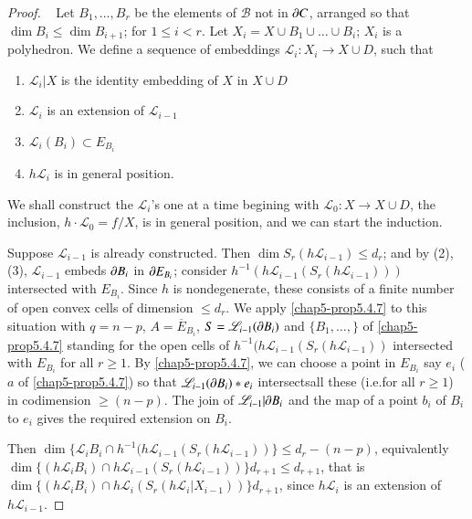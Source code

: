 \begin{proof}
\medskip
{}~ Let $B_{1},\ldots,B_{r}$ be the elements of $\mathscr{B}$ not in $\partial C$, arranged so that $\dim B_{i}\leq \dim B_{i+1}$; for $1\leq i<r$. Let $X_{i}=X\cup B_{1}\cup\ldots\cup B_{i}$; $X_{i}$ is a polyhedron. We define a sequence of embeddings $\mathscr{L}_{i}:X_{i}\to X\cup D$, such that
\begin{enumerate}
\renewcommand{\labelenumi}{(\theenumi)}
\item $\mathscr{L}_{i}|X$ is the identity embedding of $X$ in $X\cup D$

\item $\mathscr{L}_{i}$ is an extension of $\mathscr{L}_{i-1}$

\item $\mathscr{L}_{i}(B_{i})\subset E_{B_{i}}$

\item $h\mathscr{L}_{i}$ is in general position.
\end{enumerate}

We shall construct the $\mathscr{L}_{i}$'s one at a time begining with $\mathscr{L}_{0}:X\to X\cup D$, the inclusion, $h\cdot \mathscr{L}_{0}=f/X$, is in general position, and we can start the induction.

Suppose $\mathscr{L}_{i-1}$ is already constructed. Then $\dim S_{r}(h\mathscr{L}_{i-1})\leq d_{r}$; and by (2), (3), $\mathscr{L}_{i-1}$ embeds $\partial B_{i}$ in $\partial E_{B_{i}}$; consider $h^{-1}(h\mathscr{L}_{i-1}(S_{r}(h\mathscr{L}_{i-1})))$ intersected with $E_{B_{i}}$. Since $h$ is nondegenerate, these consists of a finite number of open convex cells of dimension $\leq d_{r}$. We apply \ref{chap5-prop5.4.7} to this situation with $q=n-p$, $A=\overline{E}_{B_{i}}$, $S=\mathscr{L}_{i-1}(\partial B_{i})$ and $\{B_{1},\ldots,\}$ of \ref{chap5-prop5.4.7} standing for the open cells of $h^{-1}(h\mathscr{L}_{i-1}(S_{r}(h\mathscr{L}_{i-1}))$ intersected with $E_{B_{i}}$ for all $r\geq 1$. By \ref{chap5-prop5.4.7}, we can choose a point in $E_{B_{i}}$ say $e_{i}$ ($a$ of \ref{chap5-prop5.4.7}) so that $\mathscr{L}_{i-1}(\partial B_{i})\ast e_{i}$ intersects\pageoriginale all these (i.e.\@ for all $r\geq 1$) in codimension $\geq (n-p)$. The join of $\mathscr{L}_{i-1}|\partial B_{i}$ and the 
map of a point $b_{i}$ of $B_{i}$ to $e_{i}$ gives the required extension on $B_{i}$. 

Then $\dim\{\mathscr{L}_{i}B_{i}\cap h^{-1}(h\mathscr{L}_{i-1}(S_{r}(h\mathscr{L}_{i-1}))\}\leq d_{r}-(n-p)$, equivalently $\dim \{(h\mathscr{L}_{i}B_{i})\cap h\mathscr{L}_{i-1}(S_{r}(h\mathscr{L}_{i-1}))\}d_{r+1} \leq d_{r+1}$, that is $\dim \{(h\mathscr{L}_{i}B_{i})\cap h\mathscr{L}_{i}(S_{r}(h\mathscr{L}_{i}|X_{i-1}))\}d_{r+1}$, since $h\mathscr{L}_{i}$ is an extension of $h\mathscr{L}_{i-1}$.


\end{proof}
